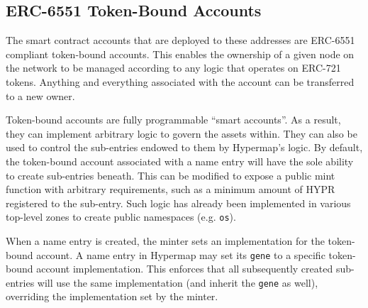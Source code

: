 \documentclass[runningheads]{llncs}
\begin{document}
\subsection{ERC-6551 Token-Bound Accounts}

The smart contract accounts that are deployed to these addresses are ERC-6551 compliant token-bound accounts.
This enables the ownership of a given node on the network to be managed according to any logic that operates on ERC-721 tokens.
Anything and everything associated with the account can be transferred to a new owner.

Token-bound accounts are fully programmable ``smart accounts''.
As a result, they can implement arbitrary logic to govern the assets within.
They can also be used to control the sub-entries endowed to them by Hypermap's logic.
By default, the token-bound account associated with a name entry will have the sole ability to create sub-entries beneath.
This can be modified to expose a public mint function with arbitrary requirements, such as a minimum amount of HYPR registered to the sub-entry.
Such logic has already been implemented in various top-level zones to create public namespaces (e.g. \verb|os|).

When a name entry is created, the minter sets an implementation for the token-bound account.
A name entry in Hypermap may set its \verb|gene| to a specific token-bound account implementation.
This enforces that all subsequently created sub-entries will use the same implementation (and inherit the \verb|gene| as well), overriding the implementation set by the minter.


\end{document}
